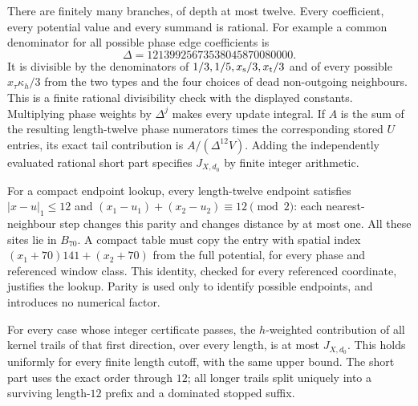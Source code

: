 There are finitely many branches, of depth at most twelve.
Every coefficient, every potential value and every summand is
rational. For example a common denominator for all possible phase
edge coefficients is
\[
 \Delta=12139925673538045870080000.
\]
It is divisible by the denominators of \(1/3,1/5,x_{\rm s}/3,
x_{\rm t}/3\) and of every possible
\(x_\tau\kappa_h/3\) from the two types and the four choices of
dead non-outgoing neighbours. This is a finite rational divisibility
check with the displayed constants. 
Multiplying phase weights by
\(\Delta^j\) makes every update integral. If \(A\) is the sum
of the resulting length-twelve phase numerators times the
corresponding stored \(U\) entries, its exact tail contribution is
\(A/(\Delta^{12}V)\). Adding the independently evaluated rational
short part specifies \(J_{X,d_0}\) by finite integer arithmetic.

For a compact endpoint lookup, every length-twelve endpoint satisfies
\(|x-u|_1\le12\) and
\((x_1-u_1)+(x_2-u_2)\equiv12\pmod2\): each nearest-neighbour
step changes this parity and changes distance by at most one.
All these sites lie in \(B_{70}\). A compact table must copy the
entry with spatial index
\((x_1+70)141+(x_2+70)\) from the full potential, for every phase
and referenced window class. This identity, checked for every
referenced coordinate, justifies the lookup. Parity is used only
to identify possible endpoints, and introduces no numerical factor.

\begin{lemma}\label{l:prefix-domination}
For every case whose integer certificate passes, the \(h\)-weighted
contribution of all kernel trails of that first direction,
over every length, is at most \(J_{X,d_0}\).
This holds uniformly for every finite length cutoff, with the same
upper bound. The short part uses the exact order through \(12\);
all longer trails split uniquely into a surviving length-\(12\)
prefix and a dominated stopped suffix.
\end{lemma}

